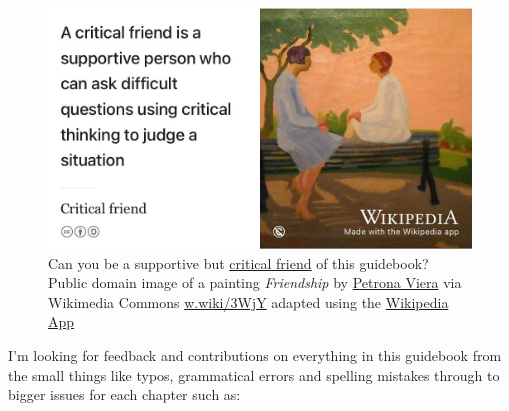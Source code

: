 \documentclass[
]{book}
\begin{document}
\begin{figure}

{\centering \includegraphics[width=1\linewidth]{images/critical-friend} 

}

\caption{Can you be a supportive but \href{https://en.wikipedia.org/wiki/Critical_friend}{critical friend} of this guidebook? Public domain image of a painting \emph{Friendship} by \href{https://en.wikipedia.org/wiki/Petrona_Viera}{Petrona Viera} via Wikimedia Commons \href{https://w.wiki/3WjY}{w.wiki/3WjY} adapted using the \href{https://apps.apple.com/us/app/wikipedia/id324715238}{Wikipedia App}}\label{fig:critical-friend-fig}
\end{figure}



I'm looking for feedback and contributions on everything in this guidebook from the small things like typos, grammatical errors and spelling mistakes through to bigger issues for each chapter such as:
\end{document}
